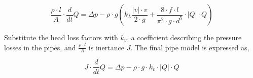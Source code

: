 
\begin{equation}\label{eq:final_pipe}
\frac{\rho \cdot l}{A} \cdot \frac{d}{dt}Q = \Delta p - \rho\cdot g\left(k_L \frac{ |v|\cdot v }{2\cdot g}+ \frac{8\cdot f  \cdot l}{\pi^2\cdot g \cdot d^5} \cdot |Q| \cdot Q\right) 
\end{equation}

Substitute the head loss factors with $k_v$, a coefficient describing the pressure losses in the pipes, and $\frac {\rho\cdot l}{A}$ is inertance $J$. The final pipe model is expressed as,

\begin{equation}\label{eq:pipe_model}
  J\cdot \frac{d}{dt}Q = \Delta p - \rho \cdot g \cdot k_v \cdot |Q| \cdot Q
\end{equation}
